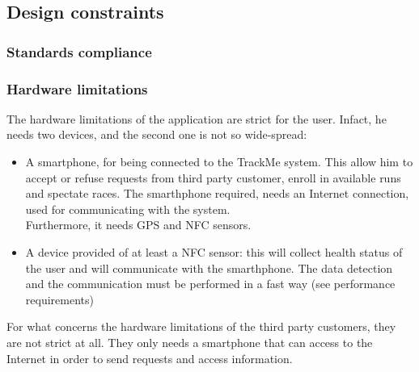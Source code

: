\subsection{Design constraints}
\subsubsection{Standards compliance}


\subsubsection{Hardware limitations}
The hardware limitations of the application are strict for the user. Infact, he needs two devices, and the second one is not so wide-spread:
\begin{itemize}
\item A smartphone, for being connected to the TrackMe system. This allow him to accept or refuse requests from third party customer, enroll in available runs and spectate races. The smarthphone required, needs an Internet connection, used for communicating with the system. \\ 
Furthermore, it needs GPS and NFC sensors.  
\item A device provided of at least a NFC sensor: this will collect health status of the user and will communicate with the smarthphone. The data detection and the communication must be performed in a fast way (see performance requirements)
\end{itemize}

For what concerns the hardware limitations of the third party customers, they are not strict at all. They only needs a smartphone that can access to the Internet in order to send requests and access information.

